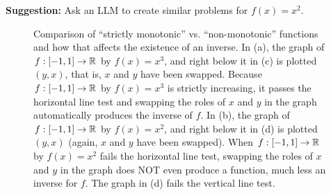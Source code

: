 \Qed

\bigskip

\textbf{Suggestion:} Ask an LLM to create similar problems for $f(x) = x^2$.

\bigskip

    
\begin{figure}[hbt]%
\centering
{}%
\hfill
{}%
\hfill
{}%
\hfill
{}%
\hfill
    \caption[]{Comparison of ``strictly monotonic'' vs. ``non-monotonic'' functions and how that affects the existence of an inverse. In (a), the graph of $f:[-1, 1] \to \mathbb R$ by $f(x)=x^3$, and right below it in (c) is plotted $(y, x)$, that is, $x$ and $y$ have been swapped. Because $f:[-1, 1] \to \mathbb R$ by $f(x) = x^3$ is strictly increasing, it passes the horizontal line test and swapping the roles of $x$ and $y$ in the graph automatically produces the inverse of $f$. In (b), the graph of $f:[-1, 1] \to \mathbb R$ by $f(x)=x^2$, and right below it in (d) is plotted $(y, x)$ (again, $x$ and $y$ have been swapped). When $f:[-1, 1] \to \mathbb R$ by $f(x) = x^2$ fails the horizontal line test, swapping the roles of $x$ and $y$ in the graph does NOT even produce a function, much less an inverse for $f$. The graph in (d) fails the vertical line test.}

\end{figure}
